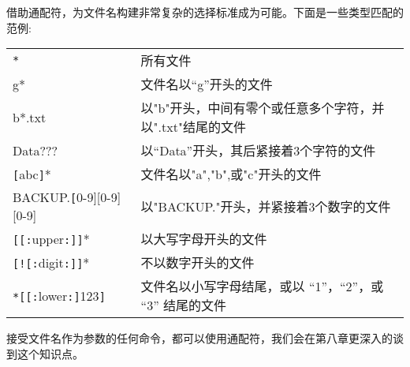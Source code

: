 \par 借助通配符，为文件名构建非常复杂的选择标准成为可能。下面是一些类型匹配的范例:
\begin{center} 
\tablelasttail{\bottomrule}

\begin{supertabular}{p{5.cm}p{11cm}}
\verb"*"	& 所有文件 \\
g*	& 文件名以“g”开头的文件 \\
b*.txt &	以"b"开头，中间有零个或任意多个字符，并以".txt"结尾的文件 \\
Data???	& 以``Data''开头，其后紧接着3个字符的文件 \\
\verb"["abc\verb"]"*	& 文件名以"a","b",或"c"开头的文件 \\
BACKUP.\verb"["0-9][0-9][0-9]	& 以"BACKUP."开头，并紧接着3个数字的文件 \\
\verb"["\verb"["\verb":"upper\verb":"\verb"]"\verb"]"* & 以大写字母开头的文件 \\
\verb"["\verb"!"\verb"["\verb":"digit\verb":"\verb"]"\verb"]"* & 不以数字开头的文件 \\
\verb"*"\verb"["\verb"["\verb":"lower\verb":"\verb"]"123\verb"]"	& 文件名以小写字母结尾，或以 “1”，“2”，或 “3” 结尾的文件 \\

\end{supertabular}
\end{center}

接受文件名作为参数的任何命令，都可以使用通配符，我们会在第八章更深入的谈到这个知识点。

